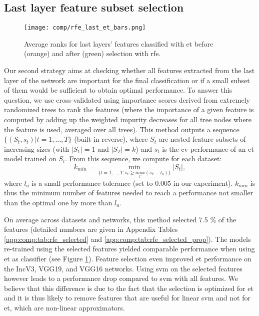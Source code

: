 \subsection{Last layer feature subset selection}
\label{ssec:comp:exp_feat_sel}

\begin{figure}
    \centering
    \texttt{[image: comp/rfe\_last\_et\_bars.png]}
    \caption{Average ranks for last layers' features classified with \acrshort{et} before (orange) and after (green) selection with \acrlong{rfe}.}
    \label{fig:comp:exp_rfe_last_et_cmp}
\end{figure}

Our second strategy aims at checking whether all features extracted from the last layer of the network are important for the final classification or if a small subset of them would be sufficient to obtain optimal performance. To answer this question, we use cross-validated  \cite{guyon2002gene} using importance scores derived from extremely randomized trees to rank the features (where the importance of a given feature is computed by adding up the weighted impurity decreases for all tree nodes where the feature is used, averaged over all trees). This method outputs a sequence $\{(S_t,s_t)|t=1,\ldots,T\}$ (built in reverse), where $S_t$ are nested feature subsets of increasing sizes (with $|S_1|=1$ and $|S_T|=k$) and $s_t$ is the \acrlong{cv} performance of an \acrshort{et} model trained on $S_t$. From this sequence, we compute for each dataset:
$$k_{min} = \min_{\{t=1,\ldots,T: s_t\geq \underset{t'}{max} (s_{t'}-l_a)\}} |S_t|,$$
where $l_a$ is a small performance tolerance (set to $0.005$ in our experiment). $k_{min}$ is thus the minimum number of features needed to reach a performance not smaller than the optimal one by more than $l_a$.

On average across datasets and networks, this method selected 7.5 \% of the features (detailed numbers are given in Appendix Tables \ref{app:comp:tab:rfe_selected} and
\ref{app:comp:tab:rfe_selected_prop}). The models re-trained using the selected features yielded comparable performance when using \acrshort{et} as classifier (see Figure \ref{fig:comp:exp_rfe_last_et_cmp}). Feature selection even improved \acrshort{et} performance on the IncV3, VGG19, and VGG16 networks. Using \acrshort{svm} on the selected features however leads to a performance drop compared to \acrshort{svm} with all features. We believe that this difference is due to the fact that the selection is optimized for \acrshort{et} and it is thus likely to remove features that are useful for linear \acrshort{svm} and not for \acrshort{et}, which are non-linear approximators.

